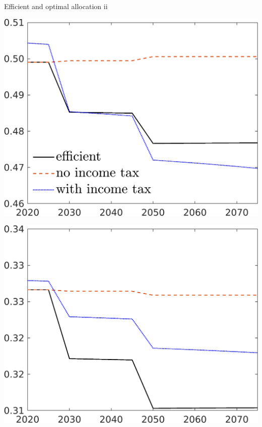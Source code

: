 \documentclass[11pt,aspectratio=169]{beamer}
\begin{document}
\addtocounter{framenumber}{-1}
\begin{frame}{Efficient and optimal allocation ii }

\vspace{6mm}
	\centering
	\begin{minipage}[]{0.3\textwidth}
		\includegraphics[width=1\textwidth]{../codding_model/own_basedOnFried/optimalPol_elastS_DisuSci/figures/all_1705/hh_CompEffOPT_T_NoTaus_spillover0_noskill0_sep1_BN0_ineq0_red0_xgrowth0_zero0_countec0_etaa0.79_lgd1.png}
	\end{minipage}
\begin{minipage}[]{0.3\textwidth}
	\includegraphics[width=1\textwidth]{../codding_model/own_basedOnFried/optimalPol_elastS_DisuSci/figures/all_1705/hl_CompEffOPT_T_NoTaus_spillover0_noskill0_sep1_BN0_ineq0_red0_xgrowth0_zero0_countec0_etaa0.79_lgd0.png}

\end{minipage}
\end{frame}
\end{document}
